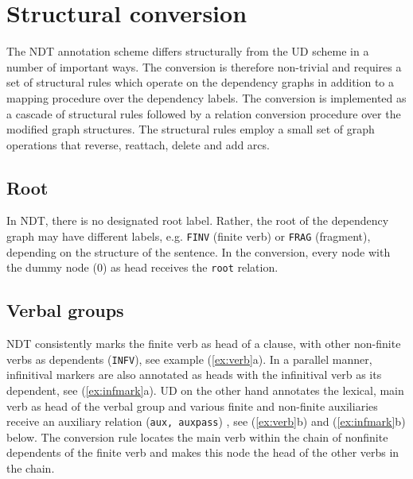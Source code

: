 \documentclass[10pt, a4paper]{article}
\begin{document}
\section{Structural conversion}
The NDT annotation scheme differs structurally from the UD scheme in
a number of important ways.  The conversion is therefore non-trivial
and requires a set of structural rules which operate on the dependency
graphs in addition to a mapping procedure over the dependency labels.
The conversion is implemented as a cascade of structural rules followed by a
relation conversion procedure over the modified graph structures.
The structural rules employ a small set of graph operations that reverse, reattach, delete and add arcs.

\subsection{Root}
In NDT, there is no designated root label. Rather, the root of the
dependency graph may have different labels, e.g. {\tt FINV} (finite
verb) or {\tt FRAG} (fragment), depending on the structure of the
sentence. In the conversion, every node with the dummy node (0) as
head receives the {\tt root} relation.

\subsection{Verbal groups}
NDT consistently marks the finite verb as head of a clause, with other
non-finite verbs as dependents ({\tt INFV}), see example
(\ref{ex:verb}a). In a parallel manner, infinitival markers are also
annotated as heads with the infinitival verb as its dependent, see
(\ref{ex:infmark}a). UD on the other hand annotates the lexical, main
verb as head of the verbal group and various finite and non-finite
auxiliaries receive an auxiliary relation ({\tt aux, auxpass}) , see
(\ref{ex:verb}b) and (\ref{ex:infmark}b) below.  The conversion rule
locates the main verb within the chain of nonfinite dependents of the
finite verb and makes this node the head of the other verbs in the
chain.
\end{document}
